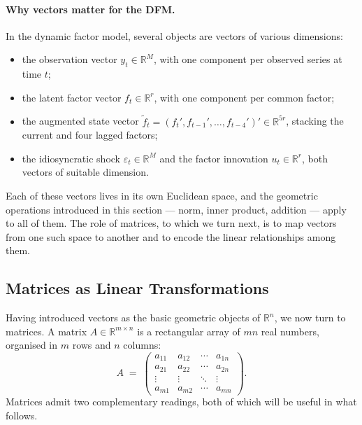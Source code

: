 \documentclass[11pt, a4paper, oneside]{article}
\begin{document}
\paragraph{Why vectors matter for the DFM.}
In the dynamic factor model, several objects are vectors of various
dimensions:
\begin{itemize}[leftmargin=1.5em, itemsep=2pt]
    \item the observation vector $y_t \in \mathbb{R}^M$, with one
          component per observed series at time $t$;
    \item the latent factor vector $f_t \in \mathbb{R}^r$, with one
          component per common factor;
    \item the augmented state vector
          $\tilde{f}_t = (f_t', f_{t-1}', \ldots, f_{t-4}')' \in \mathbb{R}^{5r}$,
          stacking the current and four lagged factors;
    \item the idiosyncratic shock $\varepsilon_t \in \mathbb{R}^M$
          and the factor innovation $u_t \in \mathbb{R}^r$, both
          vectors of suitable dimension.
\end{itemize}
Each of these vectors lives in its own Euclidean space, and the
geometric operations introduced in this section — norm, inner
product, addition — apply to all of them. The role of matrices, to
which we turn next, is to map vectors from one such space to another
and to encode the linear relationships among them.

\subsection{Matrices as Linear Transformations}
\label{sec:appendix-matrices}

Having introduced vectors as the basic geometric objects of
$\mathbb{R}^n$, we now turn to matrices. A matrix
$A \in \mathbb{R}^{m \times n}$ is a rectangular array of $mn$ real
numbers, organised in $m$ rows and $n$ columns:
\[
A \;=\; \begin{pmatrix}
a_{11} & a_{12} & \cdots & a_{1n} \\
a_{21} & a_{22} & \cdots & a_{2n} \\
\vdots & \vdots & \ddots & \vdots \\
a_{m1} & a_{m2} & \cdots & a_{mn}
\end{pmatrix}.
\]
Matrices admit two complementary readings, both of which will be
useful in what follows.
\end{document}
